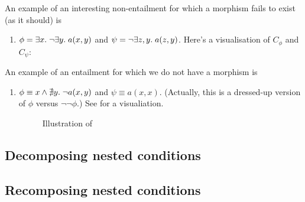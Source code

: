 \begin{enumerate}
  \begin{center}
    
  \end{center}
%
%
\end{enumerate}
%
An example of an interesting non-entailment for which a morphism fails to exist (as it should) is
%
\begin{enumerate}[resume]
\item{} $\phi=\exists x.\; \neg\exists y.\; a(x,y)$ and $\psi=\neg\exists z,y.\;  a(z,y)$. Here's a visualisation of $C_\phi$ and $C_\psi$:
  
  \begin{center}
    
  \end{center}
\end{enumerate}
%
An example of an entailment for which we do not have a morphism is
%
\begin{enumerate}[resume]
\item{} $\phi\equiv x\wedge \nexists y.\; \neg a(x,y)$ and $\psi\equiv a(x,x)$. (Actually, this is a dressed-up version of $\phi$ versus $\neg\neg\phi$.) See  for a visualiation.
  
  \begin{figure}
    \centering
%    
    \caption{Illustration of }
  \end{figure}
\end{enumerate}

\subsection{Decomposing nested conditions}

\subsection{Recomposing nested conditions}

